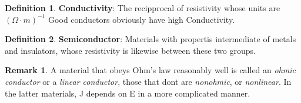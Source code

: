 \documentclass[12pt]{amsart}
\theoremstyle{definition}
\newtheorem{definition}{Definition} %
\newtheorem*{remark}{Remark}        %
\numberwithin{equation}{theorem}    %
\begin{document}
\begin{definition}
    \textbf{Conductivity}:
    The recipprocal of resistivity whose units are $(\Omega \cdot m)^{-1}$ Good conductors
    obviously have high Conductivity.
\end{definition}

\begin{definition}
    \textbf{Semiconductor}:
    Materials with propertis intermediate of metals and insulators, whose 
    resistivity is likewise between these two groups.
\end{definition}

\begin{remark}
    A material that obeys Ohm’s law reasonably well is called an \textit{ohmic 
    conductor} or a \textit{linear conductor}, those that dont are \textit{nonohmic}, 
    or \textit{nonlinear}. In the latter materials, J depends on E in a more complicated manner.
\end{remark}
\end{document}
